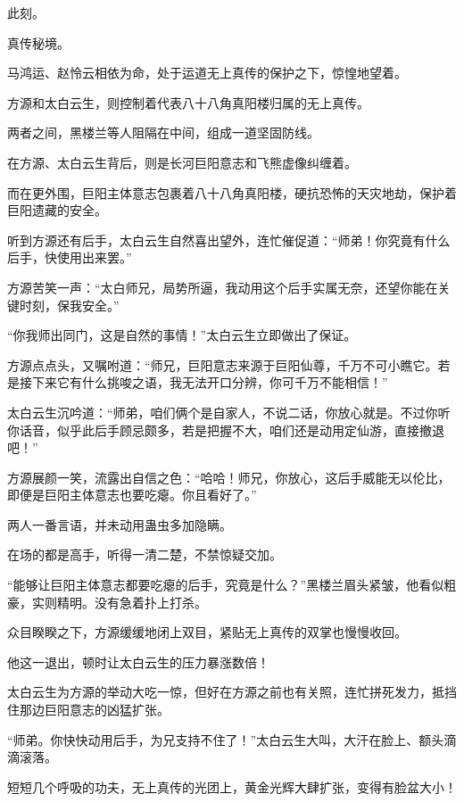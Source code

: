 
\begin{this_body}



此刻。

真传秘境。

马鸿运、赵怜云相依为命，处于运道无上真传的保护之下，惊惶地望着。

方源和太白云生，则控制着代表八十八角真阳楼归属的无上真传。

两者之间，黑楼兰等人阻隔在中间，组成一道坚固防线。

在方源、太白云生背后，则是长河巨阳意志和飞熊虚像纠缠着。

而在更外围，巨阳主体意志包裹着八十八角真阳楼，硬抗恐怖的天灾地劫，保护着巨阳遗藏的安全。

听到方源还有后手，太白云生自然喜出望外，连忙催促道：“师弟！你究竟有什么后手，快使用出来罢。”

方源苦笑一声：“太白师兄，局势所逼，我动用这个后手实属无奈，还望你能在关键时刻，保我安全。”

“你我师出同门，这是自然的事情！”太白云生立即做出了保证。

方源点点头，又嘱咐道：“师兄，巨阳意志来源于巨阳仙尊，千万不可小瞧它。若是接下来它有什么挑唆之语，我无法开口分辨，你可千万不能相信！”

太白云生沉吟道：“师弟，咱们俩个是自家人，不说二话，你放心就是。不过你听你话音，似乎此后手顾忌颇多，若是把握不大，咱们还是动用定仙游，直接撤退吧！”

方源展颜一笑，流露出自信之色：“哈哈！师兄，你放心，这后手威能无以伦比，即便是巨阳主体意志也要吃瘪。你且看好了。”

两人一番言语，并未动用蛊虫多加隐瞒。

在场的都是高手，听得一清二楚，不禁惊疑交加。

“能够让巨阳主体意志都要吃瘪的后手，究竟是什么？”黑楼兰眉头紧皱，他看似粗豪，实则精明。没有急着扑上打杀。

众目睽睽之下，方源缓缓地闭上双目，紧贴无上真传的双掌也慢慢收回。

他这一退出，顿时让太白云生的压力暴涨数倍！

太白云生为方源的举动大吃一惊，但好在方源之前也有关照，连忙拼死发力，抵挡住那边巨阳意志的凶猛扩张。

“师弟。你快快动用后手，为兄支持不住了！”太白云生大叫，大汗在脸上、额头滴滴滚落。

短短几个呼吸的功夫，无上真传的光团上，黄金光辉大肆扩张，变得有脸盆大小！


\end{this_body}
